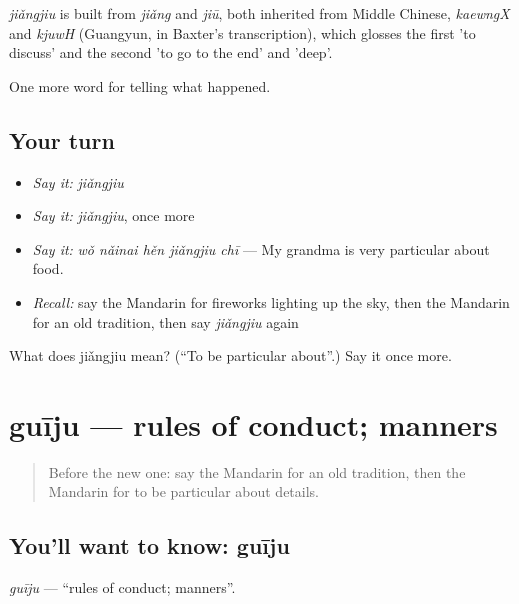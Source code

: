 \begin{cousinweb}
\emph{jiǎngjiu} is built from \emph{jiǎng} and \emph{jiū}, both inherited from Middle Chinese, \emph{kaewngX} and \emph{kjuwH} (Guangyun, in Baxter's transcription), which glosses the first 'to discuss' and the second 'to go to the end' and 'deep'.
\end{cousinweb}

\begin{grammarlens}[title={What you've built}]
One more word for telling what happened.
\end{grammarlens}

\subsection*{Your turn}
\begin{itemize}
\raggedright
  \item \emph{Say it:} \emph{jiǎngjiu}
  \item \emph{Say it:} \emph{jiǎngjiu}, once more
  \item \emph{Say it:} \emph{wǒ nǎinai hěn jiǎngjiu chī} — My grandma is very particular about food.
  \item \emph{Recall:} say the Mandarin for fireworks lighting up the sky, then the Mandarin for an old tradition, then say \emph{jiǎngjiu} again
\end{itemize}

\begin{tcolorbox}[breakable,colback=teal!4,colframe=teal!35!black,title={Before you move on}]
What does jiǎngjiu mean? (\textquotedblleft{}To be particular about\textquotedblright{}.) Say it once more.
\end{tcolorbox}
\section[guīju]{guīju — rules of conduct; manners}

\label{lesson:ZH-C340-guiju}



\begin{quote}
Before the new one: say the Mandarin for an old tradition, then the Mandarin for to be particular about details.
\end{quote}

\subsection*{You'll want to know: guīju}
\emph{guīju} — \textquotedblleft{}rules of conduct; manners\textquotedblright{}.

